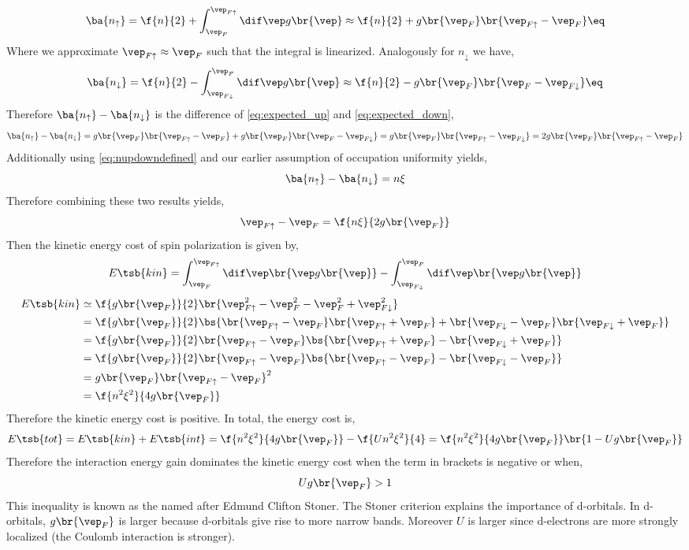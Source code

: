 \documentclass{article}
\newcommand{\uu}{\uparrow}
\newcommand{\dd}{\downarrow}
\begin{document}
\[ \ba{n_{\uu}} = \f{n}{2} + \int_{\vep_F}^{\vep_{F\uu}} \dif \vep g\br{\vep} \approx \f{n}{2} + g\br{\vep_F} \br{\vep_{F\uu} - \vep_{F}} \eq \label{eq:expected_up}\]
Where we approximate $\vep_{F\uu} \approx \vep_{F}$ such that the integral is linearized. Analogously for $n_{\dd}$ we have,
\[ \ba{n_{\dd}} = \f{n}{2} - \int_{\vep_{F\dd}}^{\vep_{F}} \dif \vep g\br{\vep} \approx \f{n}{2} - g\br{\vep_F} \br{\vep_{F} - \vep_{F\dd}} \eq \label{eq:expected_down} \]
Therefore $\ba{n_{\uu}} - \ba{n_{\dd}}$ is the difference of \cref{eq:expected_up} and \cref{eq:expected_down},
\[ \ba{n_{\uu}} - \ba{n_{\dd}} = g\br{\vep_F} \br{\vep_{F\uu} - \vep_{F}} + g\br{\vep_F} \br{\vep_{F} - \vep_{F\dd}} = g\br{\vep_F} \br{\vep_{F\uu} - \vep_{F\dd}} = 2 g\br{\vep_F}\br{\vep_{F\uu} - \vep_{F}} \]
Additionally using \cref{eq:nupdowndefined} and our earlier assumption of occupation uniformity yields,
\[ \ba{n_{\uu}} - \ba{n_{\dd}} = n \xi \]
Therefore combining these two results yields,
\[ \vep_{F\uu} - \vep_{F} = \f{n \xi}{2 g\br{\vep_F}} \]
Then the kinetic energy cost of spin polarization is given by,
\[ E\tsb{kin} = \int_{\vep_F}^{\vep_{F \uu}}\dif \vep \br{\vep g\br{\vep}} - \int_{\vep_{F \dd}}^{\vep_{F}}\dif \vep \br{\vep g\br{\vep}} \]
\begin{align*}
E\tsb{kin}
&\simeq \f{g\br{\vep_F}}{2} \br{\vep_{F \uu}^2 - \vep_{F}^2 - \vep_{F}^{2} + \vep_{F \dd}^2}\\
&= \f{g\br{\vep_F}}{2} \bs{\br{\vep_{F \uu} - \vep_{F}}\br{\vep_{F \uu} + \vep_{F}} + \br{\vep_{F \dd} - \vep_{F}}\br{\vep_{F \dd} + \vep_{F}}}\\
&= \f{g\br{\vep_F}}{2} \br{\vep_{F\uu} - \vep_F} \bs{\br{\vep_{F \uu} + \vep_{F}} - \br{\vep_{F \dd} + \vep_{F}}}\\
&= \f{g\br{\vep_F}}{2} \br{\vep_{F\uu} - \vep_F} \bs{\br{\vep_{F \uu} - \vep_{F}} - \br{\vep_{F \dd} - \vep_{F}}}\\
&= g\br{\vep_F} \br{\vep_{F\uu} - \vep_F}^2 \\
&= \f{n^2 \xi^2}{4 g\br{\vep_F}}
\end{align*}
Therefore the kinetic energy cost is positive. In total, the energy cost is,
\[ E\tsb{tot} = E\tsb{kin} + E\tsb{int} = \f{n^2 \xi^2}{4 g\br{\vep_F}} - \f{U n^2 \xi^2}{4} = \f{n^2 \xi^2}{4 g\br{\vep_F}} \br{1 - U g\br{\vep_F}} \]
Therefore the interaction energy gain dominates the kinetic energy cost when the term in brackets is negative or when,
\[ U g\br{\vep_F} > 1 \]
This inequality is known as the  named after Edmund Clifton Stoner. The Stoner criterion explains the importance of d-orbitals. In d-orbitals, $g\br{\vep_F}$ is larger because d-orbitals give rise to more narrow bands. Moreover $U$ is larger since d-electrons are more strongly localized (the Coulomb interaction is stronger).
\end{document}
